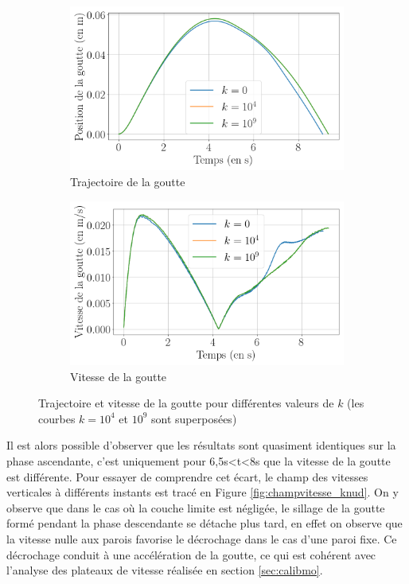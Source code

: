 \begin{figure}[H] 
	\centering
	\begin{subfigure}[H]{0.47\textwidth}
		\centering
		\includegraphics[width=\textwidth]{figure/knudsen_influence_k_position.png}
		\caption{Trajectoire de la goutte}
		
	\end{subfigure} 
	\begin{subfigure}[H]{0.47\textwidth}
		\centering
		\includegraphics[width=\textwidth]{figure/knudsen_influence_k_vitesse.png}
		\caption{Vitesse de la goutte}
	\end{subfigure}
	\caption{Trajectoire et vitesse de la goutte pour différentes valeurs de $k$ (les courbes $k=10^4$ et $10^9$ sont superposées)}
	\label{fig:resultat_knudsen}
\end{figure}
Il est alors possible d'observer que les résultats sont quasiment identiques sur la phase ascendante, c'est uniquement pour 6,5s<t<8s que la vitesse de la goutte est différente. Pour essayer de comprendre cet écart, le champ des vitesses verticales à différents instants est tracé en Figure \ref{fig:champvitesse_knud}. On y observe que dans le cas où la couche limite est négligée, le sillage de la goutte formé pendant la phase descendante se détache plus tard, en effet on observe que la vitesse nulle aux parois favorise le décrochage dans le cas d'une paroi fixe. Ce décrochage conduit à une accélération de la goutte, ce qui est cohérent avec l'analyse des plateaux de vitesse réalisée en section \ref{sec:calibmo}.
